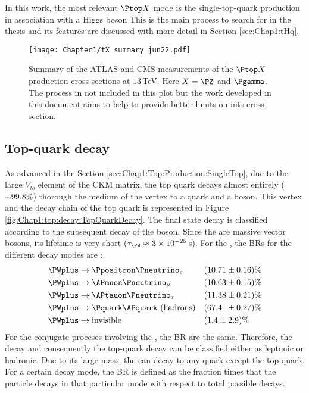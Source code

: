 In this work, the most relevant $\Ptop X$ mode is the 
single-top-quark production in association with a Higgs boson
This is the main process to search for in the thesis and its features
are discussed with more detail in Section \ref{sec:Chap1:tHq}.

\begin{figure}
    \centering
    \texttt{[image: Chapter1/tX\_summary\_jun22.pdf]}
    \caption{Summary of the ATLAS and CMS measurements of the $\Ptop X$ production 
    cross-sections at $13\,$TeV. Here $X=\PZ$ and $\Pgamma$. The \tHq process 
    in not included in this plot but the work developed in this document aims to help
    to provide better limits on ints cross-section.} %
    \label{fig:Chap1:top:tX:Cross-Sec}
\end{figure}







\subsection{Top-quark decay}
As advanced in the Section \ref{sec:Chap1:Top:Production:SingleTop}, due to the large $V_{tb}$ element of the CKM matrix, the 
top quark decays almost entirely ($\sim 99.8 \%$) thorough the medium of the \Wtb vertex to a \Pbottom quark and a \PW boson.
This vertex and the decay chain of the top quark is 
represented in Figure \ref{fig:Chap1:top:decay:TopQuarkDecay}.
The final state decay is classified according to the subsequent decay of the \PW boson. Since the \PW are massive vector bosons,
its lifetime is very short ($\tau_{\PW} \approx 3\times10^{-25}\,$s). For the \PWplus, the BRs for the different decay modes are \cite{Workman:2022ynf}:
\begin{align*}
	\PWplus &\rightarrow \Ppositron \Pneutrino_{e} 			&& (10.71 \pm 0.16)\% \\
	\PWplus &\rightarrow \APmuon \Pneutrino_{\mu} 			&& (10.63 \pm 0.15)\% \\
	\PWplus &\rightarrow \APtauon \Pneutrino_{\tau} 			&& (11.38 \pm 0.21)\% \\
	\PWplus &\rightarrow \Pquark \APquark \textrm{ (hadrons)}	&& (67.41 \pm 0.27)\% \\
	\PWplus &\rightarrow \textrm{invisible}					&& (1.4 \pm 2.9)\% 
\end{align*} 
For the conjugate proceses involving the \PWminus, the BR are the same. Therefore, the \PW decay 
and consequently the top-quark decay can be classified either as leptonic or hadronic.  
Due to its large mass, the \PW can decay to any quark except the top quark. 
For a certain decay mode, the BR is defined as the fraction times that the particle decays in that particular mode with 
respect to total possible decays.

